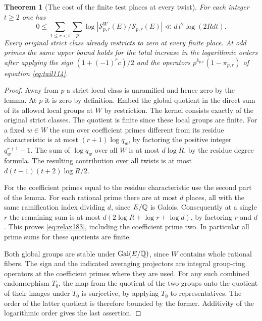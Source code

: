 \documentclass[a4paper,11pt]{article}
\newtheorem{theorem}[proposition]{Theorem}
\theoremstyle{definition}
\theoremstyle{remark}
\numberwithin{equation}{section}
\newcommand{\Sel}{\mathcal S}
\begin{document}
\begin{theorem}[The cost of the finite test places at every twist]
\label{thm:relax183}
For each integer \(t\ge2\) one has
\begin{equation}
  0\le \sum_{1\le r<t}\sum_p
       \log |\Sel^W_{p,r}(E)/\Sel_{p,r}(E)|
       \ll d\, t^2\log(2Rdt) .                          \label{eq:relax183}
\end{equation}
Every original strict class already restricts to zero at
every finite place. At odd primes the same upper bound
holds for the total increase in the logarithmic orders
after applying the sign \((1+(-1)^r c)/2\) and the operators
\(p^{k_{p,r}}(1-\pi_{p,r})\) of equation \ref{eq:tail114}.
\end{theorem}
\begin{proof}
Away from \(p\) a strict local class is unramified and
hence zero by the lemma. At \(p\) it is zero by definition.
Embed the global quotient in the direct sum of its
allowed local groups at \(W\) by restriction. The kernel
consists exactly of the original strict classes. The
quotient is finite since these local groups are finite.
For a fixed \(w\in W\) the sum over coefficient primes
different from its residue characteristic is at most
\((r+1)\log q_w\), by factoring the positive integer
\(q_w^{r+1}-1\). The sum of \(\log q_w\) over all \(W\)
is at most \(d\log R\), by the residue degree formula.
The resulting contribution over all twists is at most
\(d(t-1)(t+2)\log R/2\).

For the coefficient primes equal to the residue characteristic
use the second part of the lemma. For each rational prime
there are at most \(d\) places, all with the same
ramification index dividing \(d\), since \(E/\mathbb Q\) is
Galois. Consequently at a single \(r\) the remaining
sum is at most \(d(2\log R+\log r+\log d)\), by factoring
\(r\) and \(d\). This proves \eqref{eq:relax183}, including
the coefficient prime two. In particular all prime sums
for these quotients are finite.

Both global groups are stable under \(\operatorname{Gal}(E/\mathbb Q)\),
since \(W\) contains whole rational fibers. The sign and
the indicated averaging projectors are integral group-ring
operators at the coefficient primes where they are used.
For any such combined endomorphism \(T_0\), the map from
the quotient of the two groups onto the quotient of their
images under \(T_0\) is surjective, by applying \(T_0\)
to representatives. The order of the latter quotient is
therefore bounded by the former. Additivity of the
logarithmic order gives the last assertion.
\end{proof}
\end{document}
